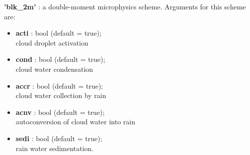 \documentclass[11pt]{article}
\begin{document}
\begin{itemize}
\textbf{'blk\_2m'} : a double-moment microphysics scheme. Arguments for this scheme are:
\begin{itemize}[label=$\bullet$]
\item \textbf{acti} : bool (default = true); \\ cloud droplet activation
\item \textbf{cond} : bool (default = true); \\ cloud water condensation
\item \textbf{accr} : bool (default = true); \\ cloud water collection by rain
\item \textbf{acnv} : bool (default = true); \\ autoconversion of cloud water into rain
\item \textbf{sedi} : bool (default = true); \\ rain water sedimentation.
\end{itemize}


\end{itemize}
\end{document}
